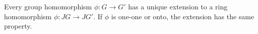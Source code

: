 Every group homomorphism $\phi: G \to G'$ has a unique extension to a ring homomorphism $\phi: JG \to JG'$. If $\phi$ is one-one or onto, the extension has the same property.
